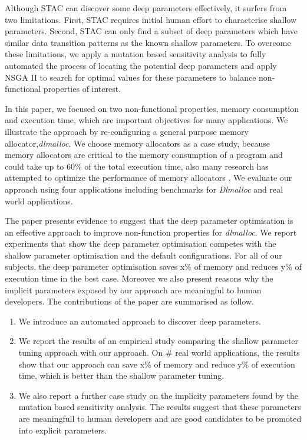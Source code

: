 Although STAC can discover some deep parameters effectively, it surfers from two limitations. First, STAC requires initial human effort to characterise shallow parameters. Second, STAC can only find a subset of deep parameters which have similar data transition patterns as the known shallow parameters. To overcome these limitations, we apply a mutation based sensitivity analysis to fully automated the process of locating the potential deep parameters and apply NSGA II to search for optimal values for these parameters to balance non-functional properties of interest. 

In this paper, we focused on two non-functional properties, memory consumption and execution time, which are important objectives for many applications. We illustrate the approach by re-configuring a general purpose memory allocator,\emph{dlmalloc}. We choose memory allocators as a case study, because memory allocators are critical to the memory consumption of a program and could take up to 60\% of the total execution time\cite{Zorn:1992:EMS:142181.142200}, also many research has attempted to optimize the performance of memory allocators \cite{Risco-Martin:2009:ODM:1569901.1570116,RiscoMartin2010572}. We evaluate our approach using four applications including benchmarks for \emph{Dlmalloc} and real world applications.

The paper presents evidence to suggest that the deep parameter optimisation is an effective approach to improve non-function properties for \emph{dlmalloc}. 
We report experiments that show the deep parameter optimisation competes with the shallow parameter optimisation and the default configurations. For all of our subjects, the deep parameter optimisation saves x\% of memory and reduces y\% of execution time in the best case. Moreover we also present reasons why the implicit parameters exposed by our approach are meaningful to human developers. The contributions of the paper are summarised as follow.


\begin{enumerate}

\item We introduce an automated approach to discover deep parameters. 

\item We report the results of an empirical study comparing the shallow parameter tuning approach with our approach. On \# real world applications, the results show that our approach can save x\% of memory and reduce y\% of execution time, which is better than the shallow parameter tuning. 

\item We also report a further case study on the implicity parameters found by the mutation based sensitivity analysis. The results suggest that these parameters are meaningfull to human developers and are good candidates to be promoted into explicit parameters. 

\end{enumerate}

